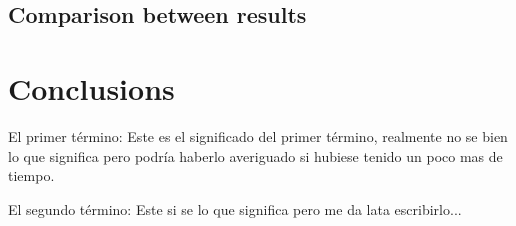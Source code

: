 \documentclass{iccmemoria}
\begin{document}
\section{Comparison between results}

\chapter{Conclusions}





\begin{glosario}
  \item[El primer término:] Este es el significado del primer término, realmente no se bien lo que significa pero podría haberlo averiguado si hubiese tenido un poco mas de tiempo.
  \item[El segundo término:] Este si se lo que significa pero me da lata escribirlo...
\end{glosario}





\appendixpart
\end{document}
